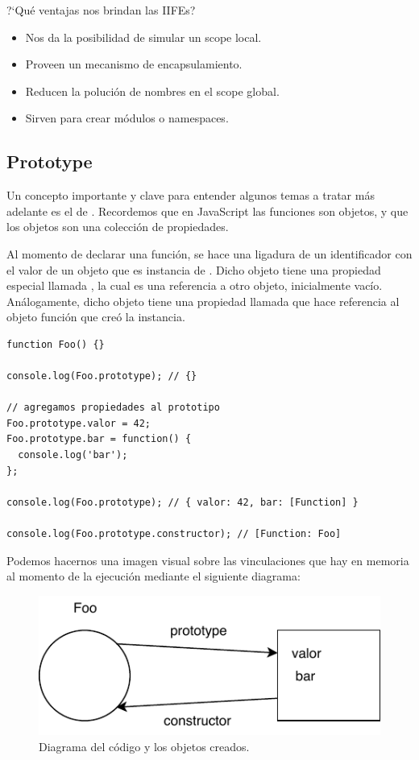 ?`Qué ventajas nos brindan las IIFEs?

\begin{itemize}
	\item Nos da la posibilidad de simular un scope local.
	\item Proveen un mecanismo de encapsulamiento.
	\item Reducen la polución de nombres en el scope global.
	\item Sirven para crear módulos o namespaces.
\end{itemize}

\subsection{Prototype}
\label{sec:prototype}

Un concepto importante y clave para entender algunos temas a tratar más adelante es el de . Recordemos que en JavaScript las funciones son objetos, y que los objetos son una colección de propiedades. 

Al momento de declarar una función, se hace una ligadura de un identificador con el valor de un objeto que es instancia de . Dicho objeto tiene una propiedad especial llamada , la cual es una referencia a otro objeto, inicialmente vacío. Análogamente, dicho objeto tiene una propiedad llamada  que hace referencia al objeto función que creó la instancia.

\begin{lstlisting}[title={Analizando el \code{prototype} de una función}]
function Foo() {}

console.log(Foo.prototype); // {}

// agregamos propiedades al prototipo
Foo.prototype.valor = 42;
Foo.prototype.bar = function() {
  console.log('bar');
};

console.log(Foo.prototype); // { valor: 42, bar: [Function] }

console.log(Foo.prototype.constructor); // [Function: Foo]

\end{lstlisting}

Podemos hacernos una imagen visual sobre las vinculaciones que hay en memoria al momento de la ejecución mediante el siguiente diagrama:

\begin{figure}[th]
\centering
\includegraphics{Figures/Prototype}
\decoRule
\caption[]{Diagrama del código y los objetos creados.}
\label{fig:prototype}
\end{figure}

